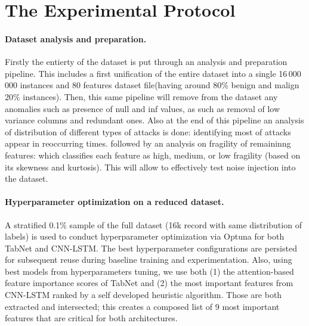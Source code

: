 \documentclass{article}
\begin{document}
\section{The Experimental Protocol}

\paragraph{Dataset analysis and preparation.} Firstly the entierty of the dataset 
    is put through an analysis and preparation pipeline. This includes a first unification of the entire dataset into a single 16\,000\,000 instances and 80 features dataset file(having around 80\% benign and malign 20\% instances). Then, this same pipeline will remove  from the dataset any anomalies such as presence of null and inf values, as such as removal of low variance columns and redundant ones. 
    Also at the end of this pipeline an analysis of distribution of different types of attacks is done: identifying most of attacks appear in reoccurring times. followed by an analysis on fragility of remaininng features: which classifies each feature as high, medium, or low fragility (based on its skewness and kurtosis). This will allow to effectively test noise injection into the dataset. 
    
\paragraph{Hyperparameter optimization on a reduced dataset.}
    A stratified 0.1\% sample of the full dataset (16k record with same distribution of labels) is used to conduct hyperparameter optimization via Optuna for both TabNet and CNN-LSTM.
    The best hyperparameter configurations are persisted for subsequent reuse during baseline training and experimentation. Also, using best models from hyperparameters tuning, we use both (1) the attention-based feature importance scores of TabNet and (2) the most important features from CNN-LSTM ranked by a self developed heuristic algorithm. Those are both extracted and intersected; this creates a composed list of 9 most important features that are critical for both architectures.
    
\end{document}
